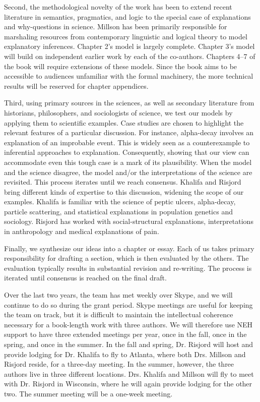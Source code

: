 \documentclass{article}[11pt]
\begin{document}
Second, the methodological novelty of the work has been to extend recent literature in semantics, pragmatics, and logic to the special case of explanations and why-questions in science. Millson has been primarily responsible for marshaling resources from contemporary linguistic and logical theory to model explanatory inferences. Chapter 2's model is largely complete. Chapter 3's model will build on independent earlier work by each of the co-authors. Chapters 4--7 of the book will require extensions of these models. Since the book aims to be accessible to audiences unfamiliar with the formal machinery, the more technical results will be reserved for chapter appendices.

Third, using primary sources in the sciences, as well as secondary literature from historians, philosophers, and sociologists of science, we test our models by applying them to scientific examples. Case studies are chosen to highlight the relevant features of a particular discussion. For instance, alpha-decay involves an explanation of an improbable event. This is widely seen as a counterexample to inferential approaches to explanation. Consequently, showing that our view can accommodate even this tough case is a mark of its plausibility. When the model and the science disagree, the model and/or the interpretations of the science are revisited. This process iterates until we reach consensus.  Khalifa and Risjord bring different kinds of expertise to this discussion, widening the scope of our examples. Khalifa is familiar with the science of peptic ulcers, alpha-decay, particle scattering, and statistical explanations in population genetics and sociology. Risjord has worked with social-structural explanations, interpretations in anthropology and medical explanations of pain.

Finally, we synthesize our ideas into a chapter or essay. Each of us takes primary responsibility for drafting a section, which is then evaluated by the others.  The evaluation typically results in substantial revision and re-writing. The process is iterated until consensus is reached on the final draft. 

Over the last two years, the team has met weekly over Skype, and we will continue to do so during the grant period.  Skype meetings are useful for keeping the team on track, but it is difficult to maintain the intellectual coherence necessary for a book-length work with three authors.  We will therefore use NEH support to have three extended meetings per year, once in the fall, once in the spring, and once in the summer. In the fall and spring, Dr. Risjord will host and provide lodging for Dr. Khalifa to fly to Atlanta, where both Drs. Millson and Risjord reside, for a three-day meeting.  In the summer, however, the three authors live in three different locations. Drs. Khalifa and Millson will fly to meet with Dr. Risjord in Wisconsin, where he will again provide lodging for the other two. The summer meeting will be a one-week meeting.
\end{document}

